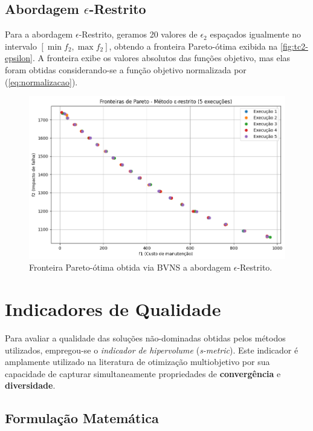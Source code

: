 \documentclass[
	12pt,				%
	oneside,			%
	a4paper,			%
	chapter=TITLE,
	sumario=tradicional,
	english,			%
	brazil				%
]{abntex2}
\begin{document}
\section{Abordagem $\epsilon$-Restrito}

Para a abordagem $\epsilon$-Restrito, geramos 20 valores de 
$\epsilon_2$ espaçados igualmente no intervalo $\left[ \min f_2 , \max f_2 \right]$,
obtendo a fronteira Pareto-ótima exibida na \autoref{fig:tc2-epsilon}.
A fronteira exibe os valores absolutos das funções objetivo, mas 
elas foram obtidas considerando-se a função objetivo normalizada por 
(\ref{eq:normalizacao}).

\begin{figure}[h!]
	\caption{\label{fig:tc2-epsilon}Fronteira Pareto-ótima obtida via BVNS a 
	abordagem $\epsilon$-Restrito.}
	\begin{center}
    \includegraphics[width=\textwidth,trim=1 1 1 1,clip]{tc2-epsilon.png}
	\end{center}
\end{figure}


\chapter{Indicadores de Qualidade}\label{cap:analise} 

Para avaliar a qualidade das soluções não-dominadas obtidas pelos métodos utilizados, empregou-se o
\textit{indicador de hipervolume} (\textit{s-metric}). Este indicador é amplamente utilizado na literatura de otimização multiobjetivo
por sua capacidade de capturar simultaneamente propriedades de \textbf{convergência} e \textbf{diversidade}.

\section{Formulação Matemática}
\end{document}
